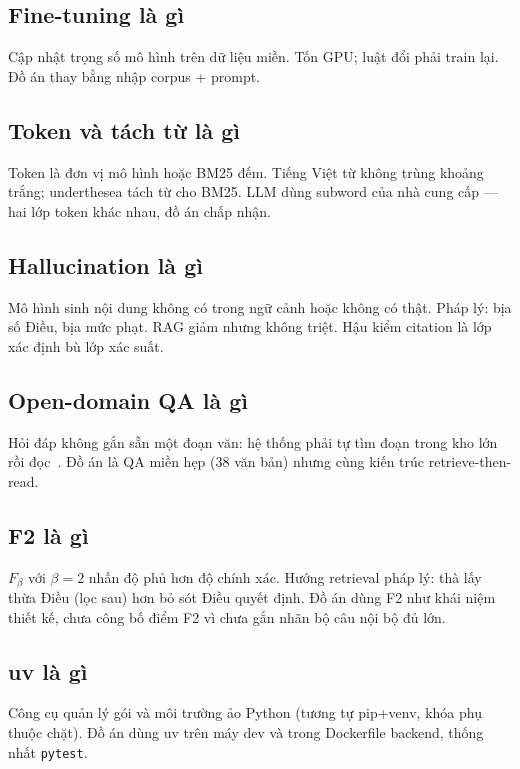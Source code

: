 \subsection{Fine-tuning là gì}

Cập nhật trọng số mô hình trên dữ liệu miền. Tốn GPU; luật đổi phải train lại.
Đồ án thay bằng nhập corpus + prompt.

\subsection{Token và tách từ là gì}

Token là đơn vị mô hình hoặc BM25 đếm. Tiếng Việt từ không trùng khoảng trắng;
underthesea tách từ cho BM25. LLM dùng subword của nhà cung cấp --- hai lớp
token khác nhau, đồ án chấp nhận.

\subsection{Hallucination là gì}

Mô hình sinh nội dung không có trong ngữ cảnh hoặc không có thật. Pháp lý: bịa
số Điều, bịa mức phạt. RAG giảm nhưng không triệt. Hậu kiểm citation là lớp
xác định bù lớp xác suất.

\subsection{Open-domain QA là gì}

Hỏi đáp không gắn sẵn một đoạn văn: hệ thống phải tự tìm đoạn trong kho lớn rồi
đọc~\cite{karpukhin2020dpr}. Đồ án là QA miền hẹp (38 văn bản) nhưng cùng kiến
trúc retrieve-then-read.

\subsection{F2 là gì}

$F_\beta$ với $\beta=2$ nhấn độ phủ hơn độ chính xác. Hướng retrieval pháp lý:
thà lấy thừa Điều (lọc sau) hơn bỏ sót Điều quyết định. Đồ án dùng F2 như khái
niệm thiết kế, chưa công bố điểm F2 vì chưa gắn nhãn bộ câu nội bộ đủ lớn.

\subsection{uv là gì}

Công cụ quản lý gói và môi trường ảo Python (tương tự pip+venv, khóa phụ thuộc
chặt). Đồ án dùng uv trên máy dev và trong Dockerfile backend, thống nhất
\texttt{pytest}.

